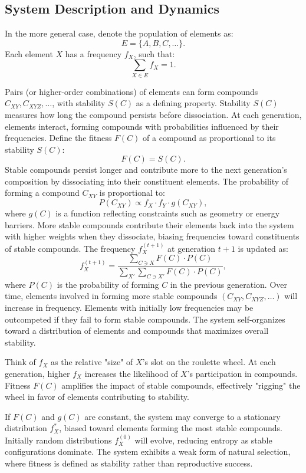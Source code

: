 \documentclass[entropy,article,submit,pdftex,moreauthors]{Definitions/mdpi}
\begin{document}
\subsection{System Description and Dynamics}
In the more general case, denote the population of elements as:
\[
E = \{A, B, C, \dots\}.
\]
Each element \( X \) has a frequency \( f_X \), such that:
\[
\sum_{X \in E} f_X = 1.
\]

Pairs (or higher-order combinations) of elements can form compounds \( C_{XY}, C_{XYZ}, \dots \), with stability \( S(C) \) as a defining property. Stability \( S(C) \) measures how long the compound persists before dissociation. At each generation, elements interact, forming compounds with probabilities influenced by their frequencies. Define the fitness \( F(C) \) of a compound as proportional to its stability \( S(C) \):
\[
F(C) = S(C).
\]
Stable compounds persist longer and contribute more to the next generation's composition by dissociating into their constituent elements. The probability of forming a compound \( C_{XY} \) is proportional to:
\[
P(C_{XY}) \propto f_X \cdot f_Y \cdot g(C_{XY}),
\]
where \( g(C) \) is a function reflecting constraints such as geometry or energy barriers. More stable compounds contribute their elements back into the system with higher weights when they dissociate, biasing frequencies toward constituents of stable compounds. The frequency \( f_X^{(t+1)} \) at generation \( t+1 \) is updated as:
\begin{equation}
\label{eq1}
f_X^{(t+1)} = \frac{\sum_{C \ni X} F(C) \cdot P(C)}{\sum_{X'} \sum_{C \ni X'} F(C) \cdot P(C)},
\end{equation}
where \( P(C) \) is the probability of forming \( C \) in the previous generation. Over time, elements involved in forming more stable compounds \( (C_{XY}, C_{XYZ}, \dots) \) will increase in frequency. Elements with initially low frequencies may be outcompeted if they fail to form stable compounds. The system self-organizes toward a distribution of elements and compounds that maximizes overall stability.

Think of \( f_X \) as the relative "size" of \( X \)'s slot on the roulette wheel.
At each generation, higher \( f_X \) increases the likelihood of \( X \)'s participation in compounds. Fitness \( F(C) \) amplifies the impact of stable compounds, effectively "rigging" the wheel in favor of elements contributing to stability.

If \( F(C) \) and \( g(C) \) are constant, the system may converge to a stationary distribution \( f_X^* \), biased toward elements forming the most stable compounds. Initially random distributions \( f_X^{(0)} \) will evolve, reducing entropy as stable configurations dominate. The system exhibits a weak form of natural selection, where fitness is defined as stability rather than reproductive success.
\end{document}
